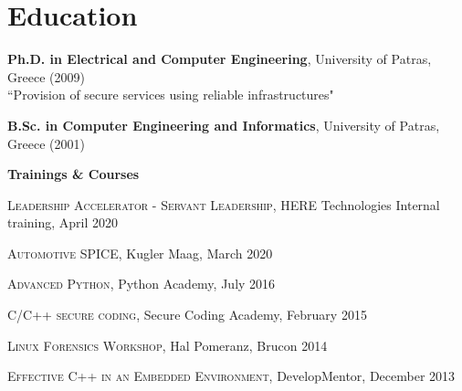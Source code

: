 \documentclass[alan.tex]{subfiles}
\begin{document}
  \section{Education}
  \begin{description}
    \item \textbf{Ph.D. in Electrical and Computer Engineering}, University of Patras, Greece (2009)\\
    ``Provision of secure services using reliable infrastructures"
    \item \textbf{B.Sc. in Computer Engineering and Informatics}, University of Patras, Greece (2001)
  \end{description}
  \begin{description}
  \item \textbf{Trainings \& Courses}
    \begin{description}
      \item \textsc{Leadership Accelerator - Servant Leadership}, HERE Technologies Internal training, April 2020
      \item \textsc{Automotive SPICE}, Kugler Maag, March 2020
	  \item \textsc{Advanced Python}, Python Academy, July 2016
      \item \textsc{C/C++ secure coding}, Secure Coding Academy, February 2015
      \item \textsc{Linux Forensics Workshop}, Hal Pomeranz, Brucon 2014
      \item \textsc{Effective C++ in an Embedded Environment}, DevelopMentor, December 2013
    \end{description}
  \end{description}
\end{document}

